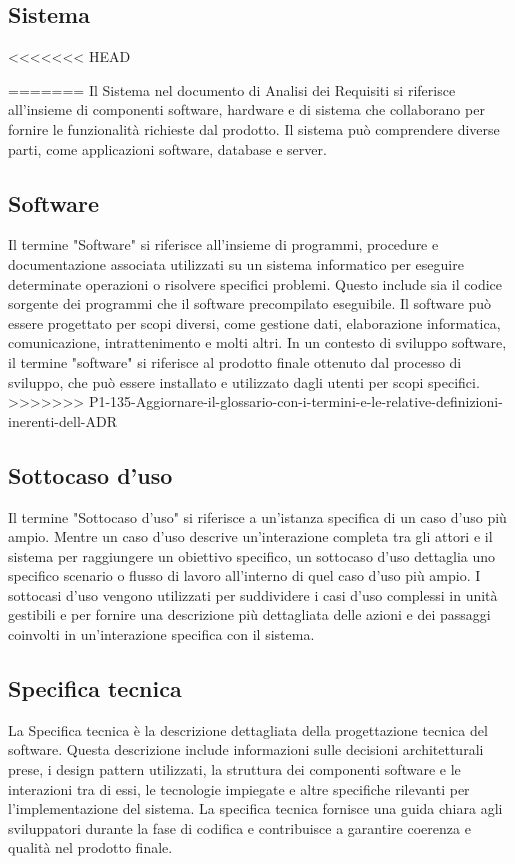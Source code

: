 \subsection{Sistema} 
<<<<<<< HEAD

=======
Il Sistema nel documento di Analisi dei Requisiti si riferisce all'insieme di componenti software, hardware e di sistema che collaborano per fornire le funzionalità richieste dal prodotto. Il sistema può comprendere diverse parti, come applicazioni software, database e server.
\subsection{Software} 
Il termine "Software" si riferisce all'insieme di programmi, procedure e documentazione associata utilizzati su un sistema informatico per eseguire determinate operazioni o risolvere specifici problemi. Questo include sia il codice sorgente dei programmi che il software precompilato eseguibile. Il software può essere progettato per scopi diversi, come gestione dati, elaborazione informatica, comunicazione, intrattenimento e molti altri. In un contesto di sviluppo software, il termine "software" si riferisce al prodotto finale ottenuto dal processo di sviluppo, che può essere installato e utilizzato dagli utenti per scopi specifici. 
>>>>>>> P1-135-Aggiornare-il-glossario-con-i-termini-e-le-relative-definizioni-inerenti-dell-ADR
\subsection{Sottocaso d'uso} 
Il termine "Sottocaso d'uso" si riferisce a un'istanza specifica di un caso d'uso più ampio. Mentre un caso d'uso descrive un'interazione completa tra gli attori e il sistema per raggiungere un obiettivo specifico, un sottocaso d'uso dettaglia uno specifico scenario o flusso di lavoro all'interno di quel caso d'uso più ampio. I sottocasi d'uso vengono utilizzati per suddividere i casi d'uso complessi in unità gestibili e per fornire una descrizione più dettagliata delle azioni e dei passaggi coinvolti in un'interazione specifica con il sistema. 
\subsection{Specifica tecnica} 
La Specifica tecnica è la descrizione dettagliata della progettazione tecnica del software. Questa descrizione include informazioni sulle decisioni architetturali prese, i design pattern utilizzati, la struttura dei componenti software e le interazioni tra di essi, le tecnologie impiegate e altre specifiche rilevanti per l'implementazione del sistema. La specifica tecnica fornisce una guida chiara agli sviluppatori durante la fase di codifica e contribuisce a garantire coerenza e qualità nel prodotto finale. 
